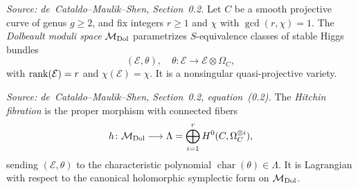 \begin{definition}
  \label{def:HitchinModuliDol}
  \uses{}
  \textit{Source: de~Cataldo--Maulik--Shen, Section~0.2.}
  Let \(C\) be a smooth projective curve of genus \(g \geq 2\), and fix
  integers \(r \geq 1\) and \(\chi\) with \(\gcd(r,\chi) = 1\).  The
  \emph{Dolbeault moduli space} \(\mathcal{M}_{\mathrm{Dol}}\) parametrizes \(S\)-equivalence classes
  of stable Higgs bundles
  \[
    (\mathcal{E},\theta), \quad \theta \colon \mathcal{E} \to \mathcal{E} \otimes \Omega_C,
  \]
  with \(\operatorname{rank}(\mathcal{E}) = r\) and \(\chi(\mathcal{E}) = \chi\).
  It is a nonsingular quasi-projective variety.
\end{definition}

\begin{definition}
  \label{def:HitchinFibration}
  \textit{Source: de~Cataldo--Maulik--Shen, Section~0.2, equation~(0.2).}
  The \emph{Hitchin fibration} is the proper morphism with connected fibers
  \[
    h \colon \mathcal{M}_{\mathrm{Dol}} \longrightarrow \Lambda
      = \bigoplus_{i=1}^r H^0(C, \Omega_C^{\otimes i}),
  \]
  sending \((\mathcal{E},\theta)\) to the characteristic polynomial
  \(\operatorname{char}(\theta) \in \Lambda\).  It is Lagrangian with respect
  to the canonical holomorphic symplectic form on \(\mathcal{M}_{\mathrm{Dol}}\).
\end{definition}

